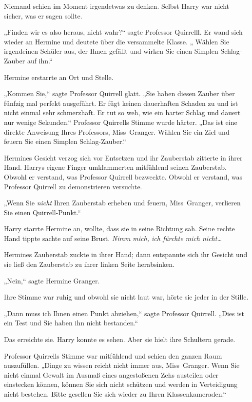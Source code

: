 {Niemand schien im Moment irgendetwas zu denken. Selbst Harry war nicht sicher, was er sagen sollte.

„Finden wir es also heraus, nicht wahr?“ sagte Professor Quirrelll. Er wand sich wieder an Hermine und deutete über die versammelte Klasse. „ Wählen Sie irgendeinen Schüler aus, der Ihnen gefällt und wirken Sie einen Simplen Schlag-Zauber auf ihn.“

Hermine erstarrte an Ort und Stelle.

„Kommen Sie,“ sagte Professor Quirrell glatt. „Sie haben diesen Zauber über fünfzig mal perfekt ausgeführt. Er fügt keinen dauerhaften Schaden zu und ist nicht einmal sehr schmerzhaft. Er tut so weh, wie ein harter Schlag und dauert nur wenige Sekunden.“ Professor Quirrells Stimme wurde härter. „Das ist eine direkte Anweisung Ihres Professors, Miss~Granger. Wählen Sie ein Ziel und feuern Sie einen Simplen Schlag-Zauber.“

Hermines Gesicht verzog sich vor Entsetzen und ihr Zauberstab zitterte in ihrer Hand. Harrys eigene Finger umklammerten mitfühlend seinen Zauberstab. Obwohl er verstand, was Professor Quirrell bezweckte. Obwohl er verstand, was Professor Quirrell zu demonstrieren versuchte.

„Wenn Sie \emph{nicht} Ihren Zauberstab erheben und feuern, Miss~Granger, verlieren Sie einen Quirrell-Punkt.“

Harry starrte Hermine an, wollte, dass sie in seine Richtung sah. Seine rechte Hand tippte sachte auf seine Brust. \emph{Nimm mich, ich fürchte mich nicht…}

Hermines Zauberstab zuckte in ihrer Hand; dann entspannte sich ihr Gesicht und sie ließ den Zauberstab zu ihrer linken Seite herabsinken.

„Nein,“ sagte Hermine Granger.

Ihre Stimme war ruhig und obwohl sie nicht laut war, hörte sie jeder in der Stille.

„Dann muss ich Ihnen einen Punkt abziehen,“ sagte Professor Quirrell. „Dies ist ein Test und Sie haben ihn nicht bestanden.“

Das erreichte sie. Harry konnte es sehen. Aber sie hielt ihre Schultern gerade.

Professor Quirrells Stimme war mitfühlend und schien den ganzen Raum auszufüllen. „Dinge zu wissen reicht nicht immer aus, Miss~Granger. Wenn Sie nicht einmal Gewalt im Ausmaß eines angestoßenen Zehs austeilen oder einstecken können, können Sie sich nicht schützen und werden in Verteidigung nicht bestehen. Bitte gesellen Sie sich wieder zu Ihren Klassenkameraden.“

}
